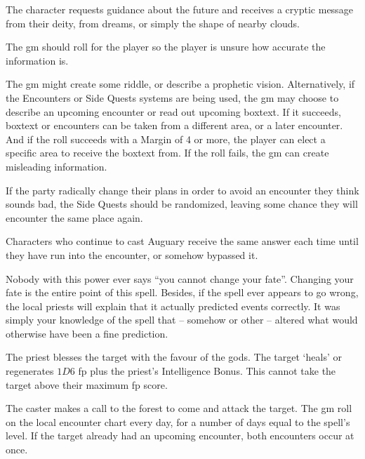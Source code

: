 \begin{multicols}{2}
The character requests guidance about the future and receives a cryptic message from their deity, from dreams, or simply the shape of nearby clouds.

The \gls{gm} should roll for the player so the player is unsure how accurate the information is.

The \gls{gm} might create some riddle, or describe a prophetic vision.
Alternatively, if the Encounters or Side Quests systems are being used, the \gls{gm} may choose to describe an upcoming encounter or read out upcoming boxtext.\iftoggle{verbose}{\footnote{See page \pageref{encounters}.}}{}
If it succeeds, boxtext or encounters can be taken from a different area, or a later encounter.
And if the roll succeeds with a Margin of 4 or more, the player can elect a specific area to receive the boxtext from.
If the roll fails, the \gls{gm} can create misleading information.

If the party radically change their plans in order to avoid an encounter they think sounds bad, the Side Quests should be randomized, leaving some chance they will encounter the same place again.

Characters who continue to cast Auguary receive the same answer each time until they have run into the encounter, or somehow bypassed it.

Nobody with this power ever says ``you cannot change your fate''.  Changing your fate is the entire point of this spell.  Besides, if the spell ever appears to go wrong, the local priests will explain that it actually predicted events correctly.  It was simply your knowledge of the spell that -- somehow or other -- altered what would otherwise have been a fine prediction.

\label{spellBlessing}

The priest blesses the target with the favour of the gods. The target `heals' or regenerates $1D6$ \gls{fp} plus the priest's Intelligence Bonus. This cannot take the target above their maximum \gls{fp} score.

\spelllevel

\label{forestsCall}

The caster makes a call to the forest to come and attack the target.
The \gls{gm} roll on the local encounter chart every day, for a number of days equal to the spell's level.
If the target already had an upcoming encounter, both encounters occur at once.


\end{multicols}
